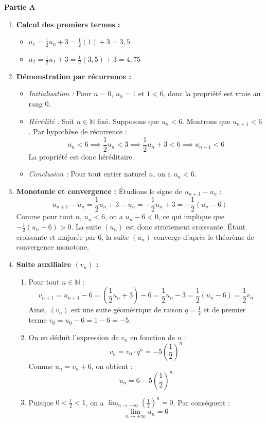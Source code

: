 \documentclass[11pt,a4paper]{article}
\newcommand{\partie}[1]{%
  \vspace{0.9em}%
  \noindent\textbf{#1}%
  \par\vspace{0.3em}%
}
\begin{document}
\partie{Partie A}

\begin{enumerate}
  \item \textbf{Calcul des premiers termes :}
  \begin{itemize}
    \item $u_1 = \frac{1}{2}u_0 + 3 = \frac{1}{2}(1) + 3 = 3,5$
    \item $u_2 = \frac{1}{2}u_1 + 3 = \frac{1}{2}(3,5) + 3 = 4,75$
  \end{itemize}

  \item \textbf{Démonstration par récurrence :}
  \begin{itemize}
    \item \textit{Initialisation :} Pour $n = 0$, $u_0 = 1$ et $1 < 6$, donc la propriété est vraie au rang $0$.
    \item \textit{Hérédité :} Soit $n \in \mathbb{N}$ fixé. Supposons que $u_n < 6$. Montrons que $u_{n+1} < 6$.
    Par hypothèse de récurrence :
    $$u_n < 6 \implies \frac{1}{2}u_n < 3 \implies \frac{1}{2}u_n + 3 < 6 \implies u_{n+1} < 6$$
    La propriété est donc héréditaire.
    \item \textit{Conclusion :} Pour tout entier naturel $n$, on a $u_n < 6$.
  \end{itemize}

  \item \textbf{Monotonie et convergence :}
  Étudions le signe de $u_{n+1} - u_n$ :
  $$u_{n+1} - u_n = \frac{1}{2}u_n + 3 - u_n = -\frac{1}{2}u_n + 3 = -\frac{1}{2}(u_n - 6)$$
  Comme pour tout $n$, $u_n < 6$, on a $u_n - 6 < 0$, ce qui implique que $-\frac{1}{2}(u_n - 6) > 0$.
  La suite $(u_n)$ est donc strictement croissante.
  Étant croissante et majorée par $6$, la suite $(u_n)$ converge d'après le théorème de convergence monotone.

  \item \textbf{Suite auxiliaire $(v_n)$ :}
  \begin{enumerate}
    \item Pour tout $n \in \mathbb{N}$ :
    $$v_{n+1} = u_{n+1} - 6 = \left(\frac{1}{2}u_n + 3\right) - 6 = \frac{1}{2}u_n - 3 = \frac{1}{2}(u_n - 6) = \frac{1}{2}v_n$$
    Ainsi, $(v_n)$ est une suite géométrique de raison $q = \frac{1}{2}$ et de premier terme $v_0 = u_0 - 6 = 1 - 6 = -5$.
    \item On en déduit l'expression de $v_n$ en fonction de $n$ :
    $$v_n = v_0 \cdot q^n = -5 \left(\frac{1}{2}\right)^n$$
    Comme $u_n = v_n + 6$, on obtient :
    $$u_n = 6 - 5 \left(\frac{1}{2}\right)^n$$
    \item Puisque $0 < \frac{1}{2} < 1$, on a $\lim_{n \to +\infty} \left(\frac{1}{2}\right)^n = 0$. Par conséquent :
    $$\lim_{n \to +\infty} u_n = 6$$
  \end{enumerate}
\end{enumerate}
\end{document}
